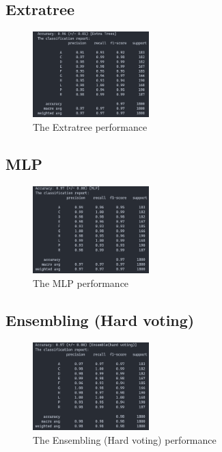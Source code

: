 \documentclass[11pt,en]{elegantpaper}
\begin{document}
\subsection*{Extratree}
\begin{figure}[H]
	\centering
	\includegraphics[width=0.4\textwidth]{image/etpf}
	\caption{The Extratree performance}
	\label{etpf}
\end{figure}


\subsection*{MLP}
\begin{figure}[H]
	\centering
	\includegraphics[width=0.4\textwidth]{image/mlppf}
	\caption{The MLP performance}
	\label{mlppf}
\end{figure}

\subsection*{Ensembling (Hard voting)}
\begin{figure}[H]
	\centering
	\includegraphics[width=0.4\textwidth]{image/hvpf}
	\caption{The Ensembling (Hard voting) performance}
	\label{hvpf}
\end{figure}
\end{document}
